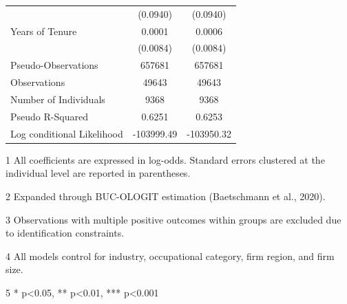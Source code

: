 \documentclass[
  12pt,
]{article}
\begin{document}
\begin{table}[!h]
{\begin{threeparttable}
\begin{tabular}[t]{lcc}
 & (0.0940) & (0.0940)\\
Years of Tenure & 0.0001 & 0.0006\\
 & (0.0084) & (0.0084)\\
\hline
\addlinespace
Pseudo-Observations & 657681 & 657681\\
Observations & 49643 & 49643\\
Number of Individuals & 9368 & 9368\\
Pseudo R-Squared & 0.6251 & 0.6253\\
Log conditional Likelihood & -103999.49 & -103950.32\\
\bottomrule
\end{tabular}
\begin{tablenotes}
\item[1] All coefficients are expressed in log-odds. Standard errors clustered at the individual level are reported in parentheses.
\item[2] Expanded through BUC-OLOGIT estimation (Baetschmann et al., 2020).
\item[3] Observations with multiple positive outcomes within groups are excluded due to identification constraints.
\item[4] All models control for industry, occupational category, firm region, and firm size.
\item[5] * p<0.05, ** p<0.01,  *** p<0.001
\end{tablenotes}
\end{threeparttable}}
\end{table}
\end{document}
